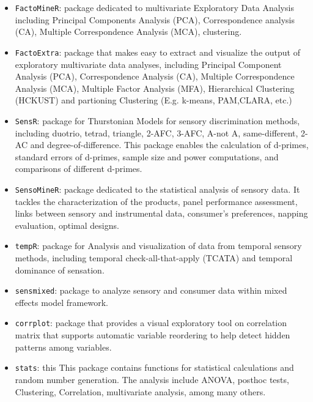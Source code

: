 \documentclass[
]{krantz}
\providecommand{\tightlist}{%
  \setlength{\itemsep}{0pt}\setlength{\parskip}{0pt}}
\begin{document}
\begin{itemize}
\tightlist
\item
  \texttt{FactoMineR}: package dedicated to multivariate Exploratory Data Analysis including Principal Components Analysis (PCA), Correspondence analysis (CA), Multiple Correspondence Analysis (MCA), clustering.
\item
  \texttt{FactoExtra}: package that makes easy to extract and visualize the output of exploratory multivariate data analyses, including Principal Component Analysis (PCA), Correspondence Analysis (CA), Multiple Correspondence Analysis (MCA), Multiple Factor Analysis (MFA), Hierarchical Clustering (HCKUST) and partioning Clustering (E.g. k-means, PAM,CLARA, etc.)
\item
  \texttt{SensR}: package for Thurstonian Models for sensory discrimination methods, including duotrio, tetrad, triangle, 2-AFC, 3-AFC, A-not A, same-different, 2-AC and degree-of-difference. This package enables the calculation of d-primes, standard errors of d-primes, sample size and power computations, and comparisons of different d-primes.
\item
  \texttt{SensoMineR}: package dedicated to the statistical analysis of sensory data. It tackles the characterization of the products, panel performance assessment, links between sensory and instrumental data, consumer's preferences, napping evaluation, optimal designs.
\item
  \texttt{tempR}: package for Analysis and visualization of data from temporal sensory methods, including temporal check-all-that-apply (TCATA) and temporal dominance of sensation.
\item
  \texttt{sensmixed}: package to analyze sensory and consumer data within mixed effects model framework.
\item
  \texttt{corrplot}: package that provides a visual exploratory tool on correlation matrix that supports automatic variable reordering to help detect hidden patterns among variables.
\item
  \texttt{stats}: this This package contains functions for statistical calculations and random number generation. The analysis include ANOVA, posthoc tests, Clustering, Correlation, multivariate analysis, among many others.
\end{itemize}

  

\backmatter
\printindex
\end{document}
